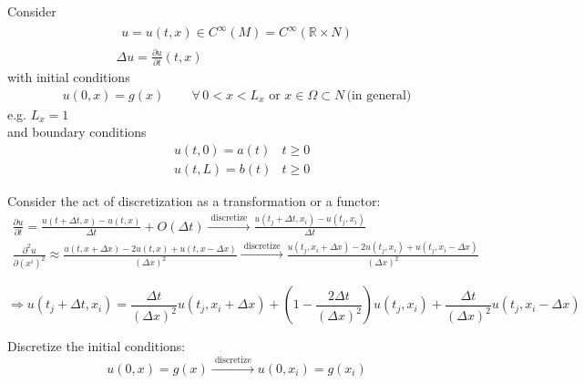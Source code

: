 \documentclass[10pt]{amsart}
\begin{document}
\begin{multicols*}{2}
Consider
\begin{equation}
\begin{gathered}
  \begin{gathered}
    u = u(t,x) \in C^{\infty}(M) = C^{\infty}(\mathbb{R}\times N)  
  \end{gathered} \\
      \Delta u = \frac{ \partial u}{ \partial t}(t,x)
  \end{gathered}
  \end{equation}
with initial conditions
\[
  \begin{gathered}
    u(0,x)=g(x) \qquad \, \forall \, 0 < x < L_x \text{ or } x \in \Omega \subset N \, \text{(in general)}
    \end{gathered}
  \]
  e.g. $L_x=1$ \\

  and boundary conditions
  \[
\begin{aligned}
  & u(t,0) = a(t) & t \geq 0 \\ 
  & u(t,L) = b(t) & t \geq 0 
\end{aligned}
  \]

  Consider the act of discretization as a transformation or a functor:
  \begin{equation}
\begin{gathered}
  \frac{ \partial u}{ \partial t} = \frac{ u(t+\Delta t,x) - u(t,x) }{ \Delta t} + O(\Delta t) \xrightarrow{ \text{ discretize } } \frac{ u(t_j + \Delta t, x_i) - u(t_j,x_i) }{ \Delta t } \\
  \frac{ \partial^2 u}{ \partial (x^i)^2 } \approx \frac{ u(t,x + \Delta x) - 2 u(t,x) + u(t, x-\Delta x) }{ (\Delta x)^2 }  \xrightarrow{ \text{ discretize } } \frac{ u(t_j  , x_i+\Delta x) - 2 u(t_j,x_i) + u(t_j,x_i-\Delta x) }{ ( \Delta x)^2 } 
\end{gathered}
  \end{equation}

  \begin{equation}
\Longrightarrow u(t_j + \Delta t, x_i) = \frac{ \Delta t}{ (\Delta x)^2 } u(t_j,x_i + \Delta x) + \left( 1 - \frac{ 2 \Delta t}{ (\Delta x)^2 } \right) u (t_j,x_i) + \frac{ \Delta t}{ (\Delta x)^2 } u(t_j,x_i - \Delta x)
  \end{equation}

  Discretize the initial conditions:
  \begin{equation}
u(0,x) = g(x) \xrightarrow{ \text{ discretize } } u(0,x_i) = g(x_i)
\end{equation}


\end{multicols*}
\end{document}
